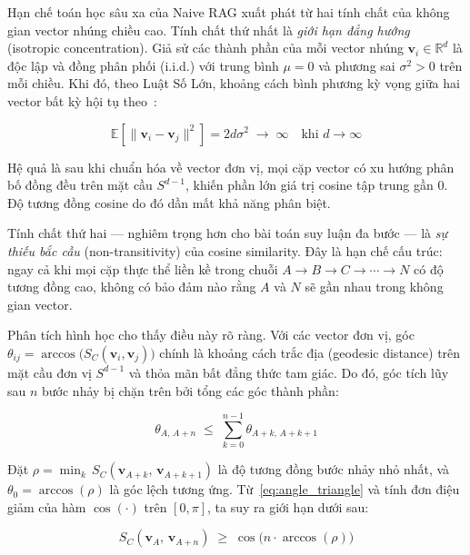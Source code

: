 \documentclass[12pt,a4paper]{report}
\theoremstyle{plain}
\theoremstyle{definition}
\begin{document}
	Hạn chế toán học sâu xa của Naive RAG xuất phát từ hai tính chất của không
	gian vector nhúng chiều cao. Tính chất thứ nhất là \emph{giới hạn đẳng hướng}
	(isotropic concentration). Giả sử các thành phần của mỗi vector nhúng
	$\mathbf{v}_i \in \mathbb{R}^d$ là độc lập và đồng phân phối (i.i.d.) với
	trung bình $\mu = 0$ và phương sai $\sigma^2 > 0$ trên mỗi chiều. Khi đó,
	theo Luật Số Lớn, khoảng cách bình phương kỳ vọng giữa hai vector bất kỳ hội
	tụ theo~\cite{ethayarajh2019contextual}:
	
	\begin{equation}
		\mathbb{E}\!\left[\|\mathbf{v}_i - \mathbf{v}_j\|^2\right]
		= 2d\sigma^2
		\;\longrightarrow\; \infty
		\quad\text{khi } d \to \infty
		\label{eq:isotropic_limit}
	\end{equation}
	
	Hệ quả là sau khi chuẩn hóa về vector đơn vị, mọi cặp vector có xu hướng
	phân bố đồng đều trên mặt cầu $S^{d-1}$, khiến phần lớn giá trị cosine tập
	trung gần $0$. Độ tương đồng cosine do đó dần mất khả năng phân biệt.
	
	Tính chất thứ hai --- nghiêm trọng hơn cho bài toán suy luận đa bước ---
	là \emph{sự thiếu bắc cầu} (non-transitivity) của cosine similarity.
	Đây là hạn chế cấu trúc: ngay cả khi mọi cặp thực thể liền kề trong chuỗi
	$A \to B \to C \to \cdots \to N$ có độ tương đồng cao, không có bảo đảm nào
	rằng $A$ và $N$ sẽ gần nhau trong không gian vector.
	
	Phân tích hình học cho thấy điều này rõ ràng. Với các vector đơn vị, góc
	$\theta_{ij} = \arccos\!\bigl(S_C(\mathbf{v}_i, \mathbf{v}_j)\bigr)$ chính là
	khoảng cách trắc địa (geodesic distance) trên mặt cầu đơn vị $S^{d-1}$ và
	thỏa mãn bất đẳng thức tam giác. Do đó, góc tích lũy sau $n$ bước nhảy bị
	chặn trên bởi tổng các góc thành phần:
	
	\begin{equation}
		\theta_{A,\,A+n}
		\;\leq\;
		\sum_{k=0}^{n-1} \theta_{A+k,\,A+k+1}
		\label{eq:angle_triangle}
	\end{equation}
	
	Đặt $\rho = \min_{k}\, S_C(\mathbf{v}_{A+k},\,\mathbf{v}_{A+k+1})$ là độ
	tương đồng bước nhảy nhỏ nhất, và $\theta_0 = \arccos(\rho)$ là góc lệch
	tương ứng. Từ~\eqref{eq:angle_triangle} và tính đơn điệu giảm của hàm
	$\cos(\cdot)$ trên $[0,\pi]$, ta suy ra giới hạn dưới sau:
	
	\begin{equation}
		S_C(\mathbf{v}_A,\,\mathbf{v}_{A+n})
		\;\geq\;
		\cos\!\bigl(n \cdot \arccos(\rho)\bigr)
		\label{eq:multi_hop_lower_bound}
	\end{equation}
	
\end{document}
